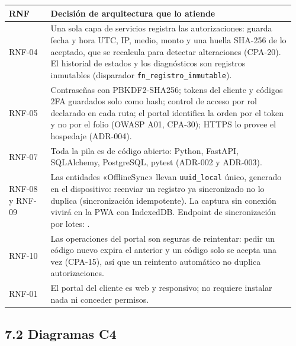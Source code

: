 {\small
\begin{longtable}{@{}L{0.14\linewidth}L{0.82\linewidth}@{}}
\toprule
\textbf{RNF} & \textbf{Decisión de arquitectura que lo atiende} \\
\midrule
\endhead
\bottomrule
\endlastfoot
RNF-04 & Una sola capa de servicios registra las autorizaciones: guarda fecha y hora UTC, IP, medio, monto
y una huella SHA-256 de lo aceptado, que se recalcula para detectar alteraciones (CPA-20). El historial de
estados y los diagnósticos son registros inmutables (disparador \texttt{fn\_registro\_inmutable}). \\
RNF-05 & Contraseñas con PBKDF2-SHA256; tokens del cliente y códigos 2FA guardados solo como hash; control
de acceso por rol declarado en cada ruta; el portal identifica la orden por el token y no por el folio
(OWASP A01, CPA-30); HTTPS lo provee el hospedaje (ADR-004). \\
RNF-07 & Toda la pila es de código abierto: Python, FastAPI, SQLAlchemy, PostgreSQL, pytest (ADR-002 y
ADR-003). \\
RNF-08 y RNF-09 & Las entidades «OfflineSync» llevan \texttt{uuid\_local} único, generado en el dispositivo:
reenviar un registro ya sincronizado no lo duplica (sincronización idempotente). La captura sin conexión
vivirá en la PWA con IndexedDB. Endpoint de sincronización por lotes: \pendiente{}. \\
RNF-10 & Las operaciones del portal son seguras de reintentar: pedir un código nuevo expira el anterior y
un código solo se acepta una vez (CPA-15), así que un reintento automático no duplica autorizaciones. \\
RNF-01 & El portal del cliente es web y responsivo; no requiere instalar nada ni conceder permisos. \\
\end{longtable}
}

\subsection{7.2 Diagramas C4}\label{diagramas-c4}




